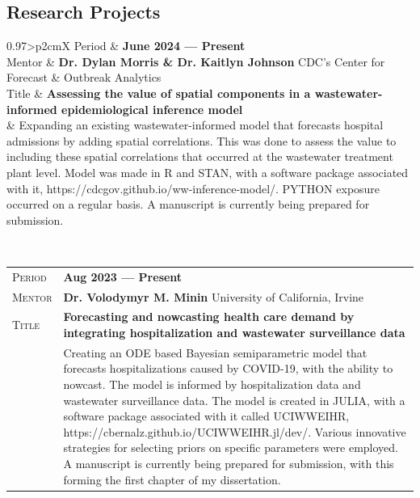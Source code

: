 \documentclass[a4paper, oneside, final]{scrartcl} %
\newcommand{\gray}{\rowcolor[gray]{.90}} %
\begin{document}
\begin{center}
		\section{Research Projects}
		
		
		\begin{tabularx}{0.97\linewidth}{>{\raggedleft\scshape}p{2cm}X}
			\gray Period & \textbf{June 2024 --- Present}\\
			\gray Mentor & \textbf{Dr. Dylan Morris \& Dr. Kaitlyn Johnson} \hfill CDC's Center for Forecast \& Outbreak Analytics\\
			\gray Title & \textbf{Assessing the value of spatial components in a wastewater-informed epidemiological inference model}\\
			& Expanding an existing wastewater-informed model that forecasts hospital admissions by adding spatial correlations.  This was done to assess the value to including these spatial correlations that occurred at the wastewater treatment plant level.  Model was made in R and STAN, with a software package associated with it, https://cdcgov.github.io/ww-inference-model/.  PYTHON exposure occurred on a regular basis.  A manuscript is currently being prepared for submission.
		\end{tabularx}\\
		\vspace*{10pt}
		\begin{tabularx}{0.97\linewidth}{>{\raggedleft\scshape}p{2cm}X}
			\gray Period & \textbf{Aug 2023 --- Present}\\
			\gray Mentor & \textbf{Dr. Volodymyr M. Minin} \hfill University of California, Irvine\\
			\gray Title & \textbf{Forecasting and nowcasting health care demand by integrating hospitalization and wastewater surveillance data}\\
			& Creating an ODE based Bayesian semiparametric model that forecasts hospitalizations caused by COVID-19, with the ability to nowcast.  The model is informed by hospitalization data and wastewater surveillance data.  The model is created in JULIA, with a software package associated with it called UCIWWEIHR, https://cbernalz.github.io/UCIWWEIHR.jl/dev/.  Various innovative strategies for selecting priors on specific parameters were employed.  A manuscript is currently being prepared for submission, with this forming the first chapter of my dissertation.
		\end{tabularx}\\
		\vspace*{10pt}

\end{center}
\end{document}
